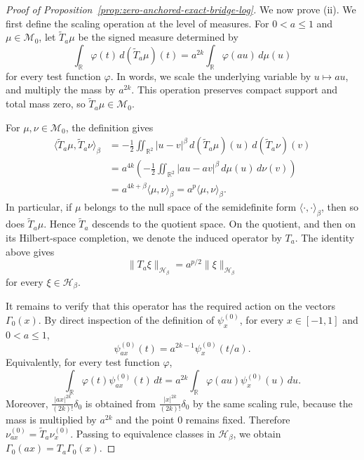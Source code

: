 \documentclass[11pt]{article}
\theoremstyle{definition}
\begin{document}
\begin{proof}[Proof of Proposition~\ref{prop:zero-anchored-exact-bridge-log}]
We now prove \textnormal{(ii)}.  We first define the scaling operation at the
level of measures.  For \(0<a\le1\) and \(\mu\in\mathcal M_0\), let
\(\widetilde T_a\mu\) be the signed measure determined by
\[
\int_{\mathbb R}\varphi(t)\,d(\widetilde T_a\mu)(t)
=
a^{2k}\int_{\mathbb R}\varphi(au)\,d\mu(u)
\]
for every test function \(\varphi\).  In words, we scale the underlying variable by
\(u\mapsto au\), and multiply the mass by \(a^{2k}\).  This operation preserves
compact support and total mass zero, so \(\widetilde T_a\mu\in\mathcal M_0\).

For \(\mu,\nu\in\mathcal M_0\), the definition gives
\[
\begin{aligned}
\langle \widetilde T_a\mu,\widetilde T_a\nu\rangle_\beta
&=
-\frac12\iint_{\mathbb R^2}|u-v|^\beta\,
d(\widetilde T_a\mu)(u)\,d(\widetilde T_a\nu)(v)\\
&=
a^{4k}\left(
-\frac12\iint_{\mathbb R^2}|au-av|^\beta\,d\mu(u)\,d\nu(v)
\right)\\
&=
a^{4k+\beta}\langle\mu,\nu\rangle_\beta
=
a^p\langle\mu,\nu\rangle_\beta .
\end{aligned}
\]
In particular, if \(\mu\) belongs to the null space of the semidefinite form
\(\langle\cdot,\cdot\rangle_\beta\), then so does \(\widetilde T_a\mu\).  Hence
\(\widetilde T_a\) descends to the quotient space.  On the quotient, and then on
its Hilbert-space completion, we denote the induced operator by \(T_a\).  The
identity above gives
\[
\|T_a\xi\|_{\mathcal H_\beta}=a^{p/2}\|\xi\|_{\mathcal H_\beta}
\]
for every \(\xi\in\mathcal H_\beta\).

It remains to verify that this operator has the required action on the vectors
\(\Gamma_0(x)\).  By direct inspection of the definition of
\(\psi_x^{(0)}\), for every \(x\in[-1,1]\) and \(0<a\le1\),
\[
\psi_{ax}^{(0)}(t)=a^{2k-1}\psi_x^{(0)}(t/a).
\]
Equivalently, for every test function \(\varphi\),
\[
\int_{\mathbb R}\varphi(t)\psi_{ax}^{(0)}(t)\,dt
=
a^{2k}\int_{\mathbb R}\varphi(au)\psi_x^{(0)}(u)\,du.
\]
Moreover,
\(
\frac{|ax|^{2k}}{(2k)!}\delta_0
\)
is obtained from
\(
\frac{|x|^{2k}}{(2k)!}\delta_0
\)
by the same scaling rule, because the mass is multiplied by \(a^{2k}\) and the
point \(0\) remains fixed.  Therefore
\(
\nu_{ax}^{(0)}=\widetilde T_a\nu_x^{(0)}.
\)
Passing to equivalence classes in \(\mathcal H_\beta\), we obtain
\(
\Gamma_0(ax)=T_a\Gamma_0(x).
\)


\end{proof}
\end{document}
